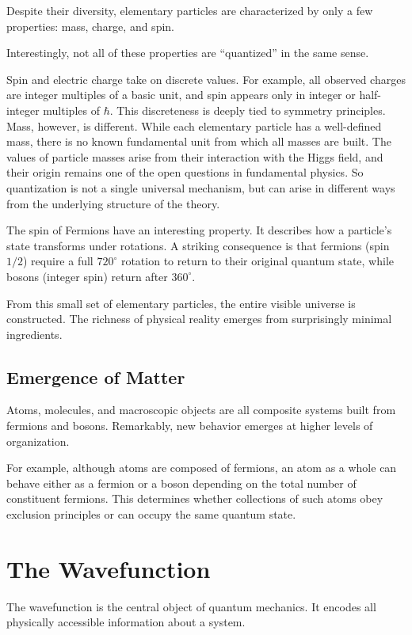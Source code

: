 Despite their diversity, elementary particles are characterized by only a few properties: mass, charge, and spin.

Interestingly, not all of these properties are ``quantized'' in the same sense.

Spin and electric charge take on discrete values. For example, all observed charges are integer multiples of a basic unit, and spin appears only in integer or half-integer multiples of $\hbar$. This discreteness is deeply tied to symmetry principles. Mass, however, is different. While each elementary particle has a well-defined mass, there is no known fundamental unit from which all masses are built. The values of particle masses arise from their interaction with the Higgs field, and their origin remains one of the open questions in fundamental physics. So quantization is not a single universal mechanism, but can arise in different ways from the underlying structure of the theory.

The spin of Fermions have an interesting property. It describes how a particle’s state transforms under rotations. A striking consequence is that fermions
(spin $1/2$) require a full $720^\circ$ rotation to return to their original quantum state, while bosons (integer spin) return after $360^\circ$.

From this small set of elementary particles, the entire visible universe is constructed. The richness of physical reality emerges from surprisingly minimal ingredients. 

\subsection*{Emergence of Matter}

Atoms, molecules, and macroscopic objects are all composite systems built from fermions and bosons. Remarkably, new behavior emerges at higher levels of organization.

For example, although atoms are composed of fermions, an atom as a whole can behave either as a fermion or a boson depending on the total number of constituent fermions. This determines whether collections of such atoms obey exclusion principles or can occupy the same quantum state.

\section*{The Wavefunction}

The wavefunction is the central object of quantum mechanics. It encodes all physically accessible information about a system.

